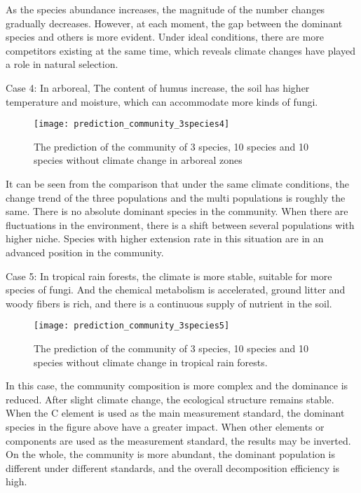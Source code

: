 \documentclass{mcmthesis}
\begin{document}
As the species abundance increases, the magnitude of the number changes gradually decreases. However, at each moment, the gap between the dominant species and others is more evident. Under ideal conditions, there are more competitors existing at the same time, which reveals climate changes have played a role in natural selection.

Case 4: In arboreal, The content of humus increase, the soil has higher temperature and moisture, which can accommodate more kinds of fungi.

\begin{figure}[H]
  \small
  \centering
  \texttt{[image: prediction\_community\_3species4]}
  \caption{The prediction of the community of 3 species, 10 species and 10 species without climate change in arboreal zones}
  \label{prediction_community_3species4}
\end{figure}

It can be seen from the comparison that under the same climate conditions, the change trend of the three populations and the multi populations is roughly the same. There is no absolute dominant species in the community. When there are fluctuations in the environment, there is a shift between several populations with higher niche. Species with higher extension rate in this situation are in an advanced position in the community.

Case 5: In tropical rain forests, the climate is more stable, suitable for more species of fungi. And the chemical metabolism is accelerated, ground litter and woody fibers is rich, and there is a continuous supply of nutrient in the soil.

\begin{figure}[H]
  \small
  \centering
  \texttt{[image: prediction\_community\_3species5]}
  \caption{The prediction of the community of 3 species, 10 species and 10 species without climate change in tropical rain forests.}
  \label{prediction_community_3species5}
\end{figure}

In this case, the community composition is more complex and the dominance is reduced. After slight climate change, the ecological structure remains stable. When the C element is used as the main measurement standard, the dominant species in the figure above have a greater impact. When other elements or components are used as the measurement standard, the results may be inverted. On the whole, the community is more abundant, the dominant population is different under different standards, and the overall decomposition efficiency is high.
\end{document}
